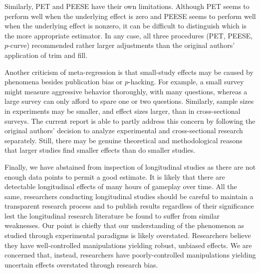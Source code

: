 \documentclass[man]{apa6}
\begin{document}

Similarly, PET and PEESE have their own limitations. Although PET seems to perform well when the underlying effect is zero and PEESE seems to perform well when the underlying effect is nonzero, it can be difficult to distinguish which is the more appropriate estimator. In any case, all three procedures (PET, PEESE, $p$-curve) recommended rather larger adjustments than the original authors' application of trim and fill.

Another criticism of meta-regression is that small-study effects may be caused by phenomena besides publication bias or $p$-hacking. For example, a small survey might measure aggressive behavior thoroughly, with many questions, whereas a large survey can only afford to spare one or two questions. Similarly, sample sizes in experiments may be smaller, and effect sizes larger, than in cross-sectional surveys. The current report is able to partly address this concern by following the original authors' decision to analyze experimental and cross-sectional research separately. Still, there may be genuine theoretical and methodological reasons that larger studies find smaller effects than do smaller studies. %

Finally, we have abstained from inspection of longitudinal studies as there are not enough data points to permit a good estimate. It is likely that there are detectable longitudinal effects of many hours of gameplay over time. All the same, researchers conducting longitudinal studies should be careful to maintain a transparent research process and to publish results regardless of their significance lest the longitudinal research literature be found to suffer from similar weaknesses. Our point is chiefly that our understanding of the phenomenon as studied through experimental paradigms is likely overstated. Researchers believe they have well-controlled manipulations yielding robust, unbiased effects. We are concerned that, instead, researchers have poorly-controlled manipulations yielding uncertain effects overstated through research bias.
\end{document}
